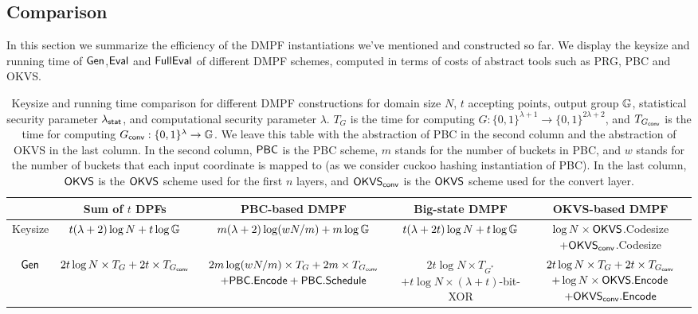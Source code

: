 \subsection{Comparison}\label{sec:DMPF_comparison}
In this section we summarize the efficiency of the DMPF instantiations we've mentioned and constructed so far. We display the keysize and running time of ${\sf Gen}$,${\sf Eval}$ and ${\sf FullEval}$ of different DMPF schemes, computed in terms of costs of abstract tools such as PRG, PBC and OKVS. 
\begin{table*}
    \renewcommand\arraystretch{1.5}
    \begin{threeparttable}
    \caption{Keysize and running time comparison for different DMPF constructions for domain size $N$, $t$ accepting points, output group $\mathbb{G}$, statistical security parameter $\lambda_{\sf stat}$, and computational security parameter $\lambda$. $T_G$ is the time for computing $G:\{0,1\}^{\lambda+1}\rightarrow \{0,1\}^{2\lambda+2}$, and $T_{G_{\sf conv}}$ is the time for computing $G_{\sf conv}:\{0,1\}^\lambda\rightarrow \mathbb{G}$. We leave this table with the abstraction of PBC in the second column and the abstraction of OKVS in the last column. In the second column, ${\sf PBC}$ is the PBC scheme, $m$ stands for the number of buckets in PBC, and $w$ stands for the number of buckets that each input coordinate is mapped to (as we consider cuckoo hashing instantiation of PBC). In the last column, ${\sf OKVS}$ is the ${\sf OKVS}$ scheme used for the first $n$ layers, and ${\sf OKVS}_{\sf conv}$ is the ${\sf OKVS}$ scheme used for the convert layer.  }
    \label{tab:formulas_DMPF_comparison}
    \begin{tabular}{ccccc}
        \toprule 
	&Sum of $t$ DPFs & PBC-based DMPF\cite{cryptoeprint:2019/273,cryptoeprint:2019/1084,cryptoeprint:2021/580,cryptoeprint:2017/1142} & Big-state DMPF & OKVS-based DMPF\\

        \midrule

	Keysize & $t(\lambda+2)\log N+t\log\mathbb{G}$ & $m(\lambda+2)\log(wN/m)+m\log\mathbb{G}$ & $t(\lambda+2t)\log N+t\log \mathbb{G}$ &\makecell{ $\log N\times{\sf OKVS}$.Codesize\\$+{\sf OKVS}_{\sf conv}$.Codesize}\\

        \cline{1-5}
				
	${\sf Gen}$ & $2t\log N\times T_G+2t\times T_{G_{\sf conv}}$ &\makecell{$2m\log(wN/m)\times T_G+2m\times T_{G_{\sf conv}}$\\$+{\sf PBC}.{\sf Encode}+{\sf PBC}.{\sf Schedule}$} &\makecell{$2t\log N\times T_{G^*}$\tnote{1}\\$+t\log N\times (\lambda+t)$-bit-XOR}
        & \makecell{$2t\log N\times T_G+2t\times T_{G_{\sf conv}}$\\$+\log N\times {\sf OKVS}.{\sf Encode}$\\$+ {\sf OKVS}_{\sf conv}.{\sf Encode}$} \\


\end{tabular}
\end{threeparttable}
\end{table*}
